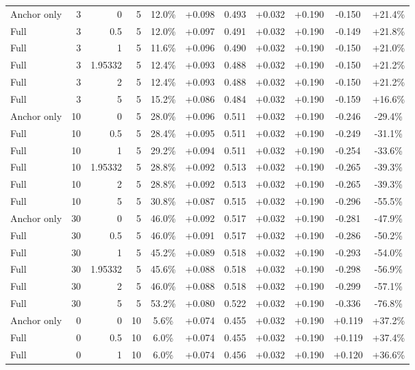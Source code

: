 \begin{table}[htbp]
\begin{tabular}{lrrrccccccc}
Anchor only & 3 & 0 & 5 & 12.0\% & +0.098 & 0.493 & +0.032 & +0.190 & -0.150 & +21.4\% \\
Full & 3 & 0.5 & 5 & 12.0\% & +0.097 & 0.491 & +0.032 & +0.190 & -0.149 & +21.8\% \\
Full & 3 & 1 & 5 & 11.6\% & +0.096 & 0.490 & +0.032 & +0.190 & -0.150 & +21.0\% \\
Full & 3 & 1.95332 & 5 & 12.4\% & +0.093 & 0.488 & +0.032 & +0.190 & -0.150 & +21.2\% \\
Full & 3 & 2 & 5 & 12.4\% & +0.093 & 0.488 & +0.032 & +0.190 & -0.150 & +21.2\% \\
Full & 3 & 5 & 5 & 15.2\% & +0.086 & 0.484 & +0.032 & +0.190 & -0.159 & +16.6\% \\
Anchor only & 10 & 0 & 5 & 28.0\% & +0.096 & 0.511 & +0.032 & +0.190 & -0.246 & -29.4\% \\
Full & 10 & 0.5 & 5 & 28.4\% & +0.095 & 0.511 & +0.032 & +0.190 & -0.249 & -31.1\% \\
Full & 10 & 1 & 5 & 29.2\% & +0.094 & 0.511 & +0.032 & +0.190 & -0.254 & -33.6\% \\
Full & 10 & 1.95332 & 5 & 28.8\% & +0.092 & 0.513 & +0.032 & +0.190 & -0.265 & -39.3\% \\
Full & 10 & 2 & 5 & 28.8\% & +0.092 & 0.513 & +0.032 & +0.190 & -0.265 & -39.3\% \\
Full & 10 & 5 & 5 & 30.8\% & +0.087 & 0.515 & +0.032 & +0.190 & -0.296 & -55.5\% \\
Anchor only & 30 & 0 & 5 & 46.0\% & +0.092 & 0.517 & +0.032 & +0.190 & -0.281 & -47.9\% \\
Full & 30 & 0.5 & 5 & 46.0\% & +0.091 & 0.517 & +0.032 & +0.190 & -0.286 & -50.2\% \\
Full & 30 & 1 & 5 & 45.2\% & +0.089 & 0.518 & +0.032 & +0.190 & -0.293 & -54.0\% \\
Full & 30 & 1.95332 & 5 & 45.6\% & +0.088 & 0.518 & +0.032 & +0.190 & -0.298 & -56.9\% \\
Full & 30 & 2 & 5 & 46.0\% & +0.088 & 0.518 & +0.032 & +0.190 & -0.299 & -57.1\% \\
Full & 30 & 5 & 5 & 53.2\% & +0.080 & 0.522 & +0.032 & +0.190 & -0.336 & -76.8\% \\
Anchor only & 0 & 0 & 10 & 5.6\% & +0.074 & 0.455 & +0.032 & +0.190 & +0.119 & +37.2\% \\
Full & 0 & 0.5 & 10 & 6.0\% & +0.074 & 0.455 & +0.032 & +0.190 & +0.119 & +37.4\% \\
Full & 0 & 1 & 10 & 6.0\% & +0.074 & 0.456 & +0.032 & +0.190 & +0.120 & +36.6\% \\

\end{tabular}
\end{table}

